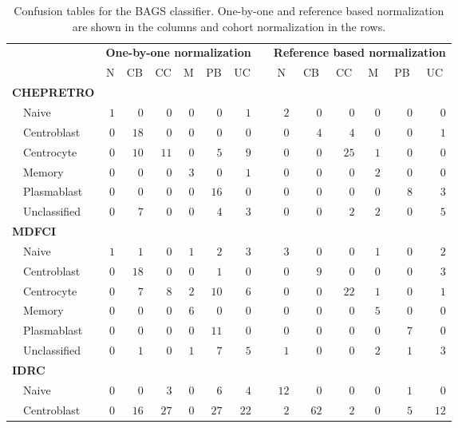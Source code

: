 \begin{table}[!tbp]
\begin{adjustwidth}{-0.75in}{0in}
{\small
\caption{Confusion tables for the BAGS classifier. One-by-one and reference
based normalization are shown in the columns and cohort normalization in the
rows.\label{tab:BAGShemaclass}} 
\begin{center}
\begin{tabular}{lrrrrrrcrrrrrr}
\hline\hline
\multicolumn{1}{l}{\bfseries }&\multicolumn{6}{c}{\bfseries One-by-one normalization}&\multicolumn{1}{c}{\bfseries }&\multicolumn{6}{c}{\bfseries Reference based normalization}\tabularnewline
\cline{2-7} \cline{9-14}
\multicolumn{1}{l}{}&\multicolumn{1}{c}{N}&\multicolumn{1}{c}{CB}&\multicolumn{1}{c}{CC}&\multicolumn{1}{c}{M}&\multicolumn{1}{c}{PB}&\multicolumn{1}{c}{UC}&\multicolumn{1}{c}{}&\multicolumn{1}{c}{N}&\multicolumn{1}{c}{CB}&\multicolumn{1}{c}{CC}&\multicolumn{1}{c}{M}&\multicolumn{1}{c}{PB}&\multicolumn{1}{c}{UC}\tabularnewline
\hline
{\bfseries CHEPRETRO}&&&&&&&&&&&&&\tabularnewline
~~Naive&$1$&$ 0$&$  0$&$0$&$ 0$&$ 1$&&$ 2$&$ 0$&$  0$&$ 0$&$ 0$&$ 0$\tabularnewline
~~Centroblast&$0$&$18$&$  0$&$0$&$ 0$&$ 0$&&$ 0$&$ 4$&$  4$&$ 0$&$ 0$&$ 1$\tabularnewline
~~Centrocyte&$0$&$10$&$ 11$&$0$&$ 5$&$ 9$&&$ 0$&$ 0$&$ 25$&$ 1$&$ 0$&$ 0$\tabularnewline
~~Memory&$0$&$ 0$&$  0$&$3$&$ 0$&$ 1$&&$ 0$&$ 0$&$  0$&$ 2$&$ 0$&$ 0$\tabularnewline
~~Plasmablast&$0$&$ 0$&$  0$&$0$&$16$&$ 0$&&$ 0$&$ 0$&$  0$&$ 0$&$ 8$&$ 3$\tabularnewline
~~Unclassified&$0$&$ 7$&$  0$&$0$&$ 4$&$ 3$&&$ 0$&$ 0$&$  2$&$ 2$&$ 0$&$ 5$\tabularnewline
\hline
{\bfseries MDFCI}&&&&&&&&&&&&&\tabularnewline
~~Naive&$1$&$ 1$&$  0$&$1$&$ 2$&$ 3$&&$ 3$&$ 0$&$  0$&$ 1$&$ 0$&$ 2$\tabularnewline
~~Centroblast&$0$&$18$&$  0$&$0$&$ 1$&$ 0$&&$ 0$&$ 9$&$  0$&$ 0$&$ 0$&$ 3$\tabularnewline
~~Centrocyte&$0$&$ 7$&$  8$&$2$&$10$&$ 6$&&$ 0$&$ 0$&$ 22$&$ 1$&$ 0$&$ 1$\tabularnewline
~~Memory&$0$&$ 0$&$  0$&$6$&$ 0$&$ 0$&&$ 0$&$ 0$&$  0$&$ 5$&$ 0$&$ 0$\tabularnewline
~~Plasmablast&$0$&$ 0$&$  0$&$0$&$11$&$ 0$&&$ 0$&$ 0$&$  0$&$ 0$&$ 7$&$ 0$\tabularnewline
~~Unclassified&$0$&$ 1$&$  0$&$1$&$ 7$&$ 5$&&$ 1$&$ 0$&$  0$&$ 2$&$ 1$&$ 3$\tabularnewline
\hline
{\bfseries IDRC}&&&&&&&&&&&&&\tabularnewline
~~Naive&$0$&$ 0$&$  3$&$0$&$ 6$&$ 4$&&$12$&$ 0$&$  0$&$ 0$&$ 1$&$ 0$\tabularnewline
~~Centroblast&$0$&$16$&$ 27$&$0$&$27$&$22$&&$ 2$&$62$&$  2$&$ 0$&$ 5$&$12$\tabularnewline

\end{tabular}
\end{center}}
\end{adjustwidth}
\end{table}
